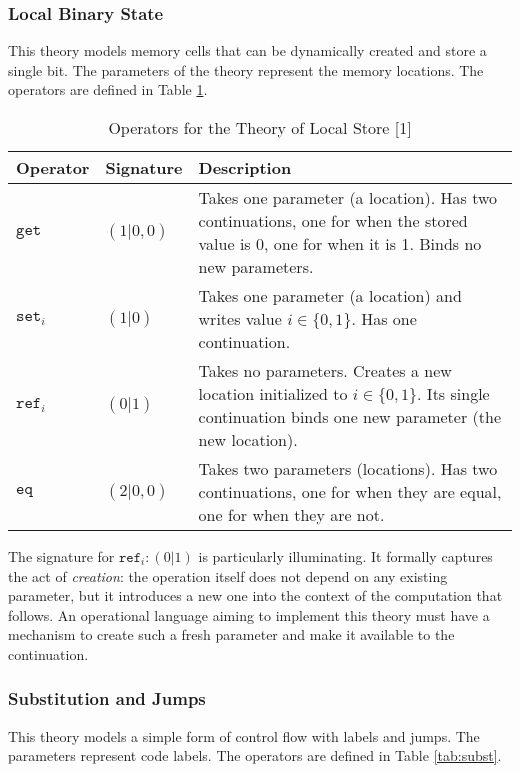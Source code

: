 \documentclass{article}
\begin{document}
\subsubsection{Local Binary State}
This theory models memory cells that can be dynamically created and store a single bit. The parameters of the theory represent the memory locations. The operators are defined in Table \ref{tab:localstore}.

\begin{table}[h!]
\centering
\caption{Operators for the Theory of Local Store [1]}
\label{tab:localstore}
\begin{tabular}{l l p{8cm}}
\hline
\textbf{Operator} & \textbf{Signature} & \textbf{Description} \\
\hline
$\texttt{get}$ & $(1|0,0)$ & Takes one parameter (a location). Has two continuations, one for when the stored value is 0, one for when it is 1. Binds no new parameters. \\
$\texttt{set}_i$ & $(1|0)$ & Takes one parameter (a location) and writes value $i \in \{0,1\}$. Has one continuation. \\
$\texttt{ref}_i$ & $(0|1)$ & Takes no parameters. Creates a new location initialized to $i \in \{0,1\}$. Its single continuation binds one new parameter (the new location). \\
$\texttt{eq}$ & $(2|0,0)$ & Takes two parameters (locations). Has two continuations, one for when they are equal, one for when they are not. \\
\hline
\end{tabular}
\end{table}

The signature for $\texttt{ref}_i: (0|1)$ is particularly illuminating. It formally captures the act of \emph{creation}: the operation itself does not depend on any existing parameter, but it introduces a new one into the context of the computation that follows. An operational language aiming to implement this theory must have a mechanism to create such a fresh parameter and make it available to the continuation.

\subsubsection{Substitution and Jumps}
This theory models a simple form of control flow with labels and jumps. The parameters represent code labels. The operators are defined in Table \ref{tab:subst}.
\end{document}
